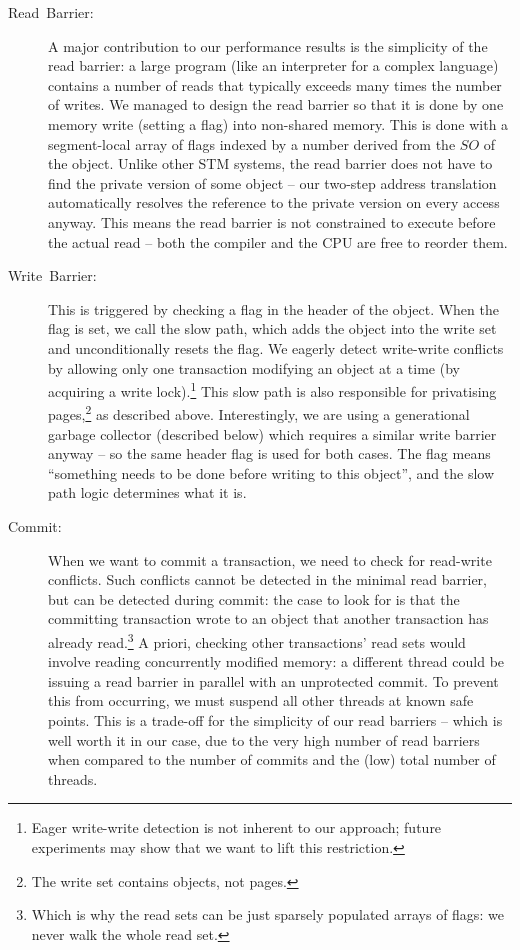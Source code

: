 \documentclass{sigplanconf}
\begin{document}
\begin{description}

\item [{Read~Barrier:}] A major contribution to our performance results
  is the simplicity of the read barrier: a large program (like an
  interpreter for a complex language) contains a number of reads that
  typically exceeds many times the number of writes.  We managed to
  design the read barrier so that it is done by one memory write
  (setting a flag) into non-shared memory.  This is done with a
  segment-local array of flags indexed by a number derived from the $SO$
  of the object.  Unlike other STM systems, the read barrier does not
  have to find the private version of some object -- our two-step
  address translation automatically resolves the reference to the
  private version on every access anyway.  This means the read barrier
  is not constrained to execute before the actual read -- both the
  compiler and the CPU are free to reorder them.

\item [{Write~Barrier:}] This is triggered by checking a flag in the
  header of the object.  When the flag is set, we call the slow path,
  which adds the object into the write set and unconditionally resets
  the flag.  We eagerly detect write-write conflicts by allowing only
  one transaction modifying an object at a time (by acquiring a write
  lock).\footnote{Eager write-write detection is not inherent to our
  approach; future experiments may show that we want to lift this
  restriction.}  This slow path is also responsible for privatising
  pages,\footnote{The write set contains objects, not pages.} as
  described above.  Interestingly, we are using a generational garbage
  collector (described below) which requires a similar write barrier
  anyway -- so the same header flag is used for both cases.  The flag
  means ``something needs to be done before writing to this object'',
  and the slow path logic determines what it is.

\item [{Commit:}] When we want to commit a transaction, we need to check
  for read-write conflicts.  Such conflicts cannot be detected in the
  minimal read barrier, but can be detected during commit: the case to
  look for is that the committing transaction wrote to an object that
  another transaction has already read.\footnote{Which is why the read
  sets can be just sparsely populated arrays of flags: we never walk the
  whole read set.} A priori, checking other transactions' read sets
  would involve reading concurrently modified memory: a different thread
  could be issuing a read barrier in parallel with an unprotected
  commit.  To prevent this from occurring, we must suspend all other
  threads at known safe points.  This is a trade-off for the simplicity
  of our read barriers -- which is well worth it in our case, due to the
  very high number of read barriers when compared to the number of
  commits and the (low) total number of threads.

\end{description}
\end{document}
